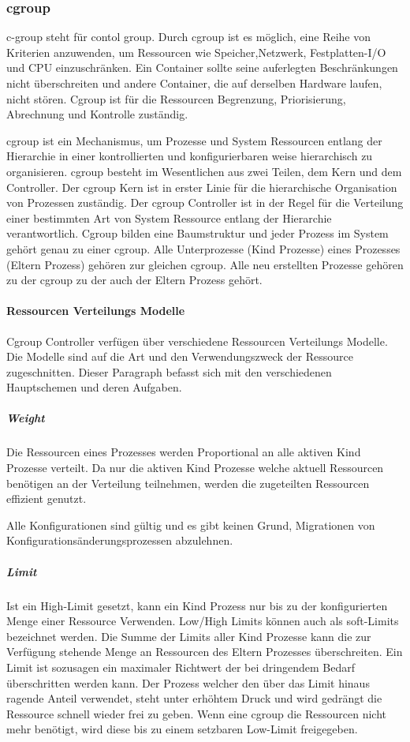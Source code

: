 \subsubsection{cgroup}
\glqq c-group\grqq{} steht für \glqq contol group\grqq{}. Durch cgroup ist es möglich, eine Reihe von Kriterien anzuwenden, um Ressourcen wie Speicher,Netzwerk, Festplatten-I/O und CPU einzuschränken. Ein Container sollte seine auferlegten Beschränkungen nicht überschreiten und andere Container, die auf derselben Hardware laufen, nicht stören. Cgroup ist für die Ressourcen Begrenzung, Priorisierung, Abrechnung und Kontrolle zuständig.\cite{Heo2015ControlV2} 

cgroup ist ein Mechanismus, um Prozesse und System Ressourcen entlang der Hierarchie in einer kontrollierten und konfigurierbaren weise hierarchisch zu organisieren. cgroup besteht im Wesentlichen aus zwei Teilen, dem Kern und dem Controller. Der cgroup Kern ist in erster Linie für die hierarchische Organisation von Prozessen zuständig. Der cgroup Controller ist in der Regel für die Verteilung einer bestimmten Art von System Ressource entlang der Hierarchie verantwortlich. Cgroup bilden eine Baumstruktur und jeder Prozess im System gehört genau zu einer cgroup. Alle Unterprozesse (Kind Prozesse) eines Prozesses (Eltern Prozess) gehören zur gleichen cgroup. Alle neu erstellten Prozesse gehören zu der cgroup zu der auch der Eltern Prozess gehört.


\paragraph{Ressourcen Verteilungs Modelle}
Cgroup Controller verfügen über verschiedene Ressourcen Verteilungs Modelle. Die Modelle sind auf die Art und den Verwendungszweck der Ressource zugeschnitten. Dieser Paragraph befasst sich mit den verschiedenen Hauptschemen und deren Aufgaben.

\subparagraph{Weight}
Die Ressourcen eines Prozesses werden Proportional an alle aktiven Kind Prozesse verteilt. Da nur die aktiven Kind Prozesse welche aktuell Ressourcen benötigen an der Verteilung teilnehmen, werden die zugeteilten Ressourcen effizient genutzt. 

Alle Konfigurationen sind gültig und es gibt keinen Grund, Migrationen von Konfigurationsänderungsprozessen abzulehnen.

\subparagraph{Limit}
Ist ein High-Limit gesetzt, kann ein Kind Prozess nur bis zu der konfigurierten Menge einer Ressource Verwenden. Low/High Limits können auch als soft-Limits bezeichnet werden. Die Summe der Limits aller Kind Prozesse kann die zur Verfügung stehende Menge an Ressourcen des Eltern Prozesses überschreiten. Ein Limit ist sozusagen ein maximaler Richtwert der bei dringendem Bedarf überschritten werden kann. Der Prozess welcher den über das Limit hinaus ragende Anteil verwendet, steht unter erhöhtem Druck und wird gedrängt die Ressource schnell wieder frei zu geben. Wenn eine cgroup die Ressourcen nicht mehr benötigt, wird diese bis zu einem setzbaren Low-Limit freigegeben.

